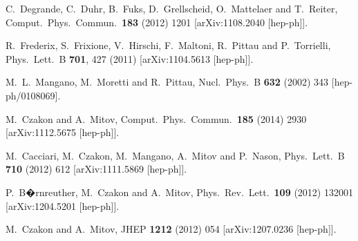\documentclass[preprintnumbers,superscriptaddress,nofootinbib,aps,prd,floatfix]{revtex4}
\begin{document}
\begin{thebibliography}{99}
  C.~Degrande, C.~Duhr, B.~Fuks, D.~Grellscheid, O.~Mattelaer and T.~Reiter,
  Comput.\ Phys.\ Commun.\  {\bf 183} (2012) 1201
  [arXiv:1108.2040 [hep-ph]].

  R.~Frederix, S.~Frixione, V.~Hirschi, F.~Maltoni, R.~Pittau and P.~Torrielli,
  Phys.\ Lett.\ B {\bf 701}, 427 (2011)
  [arXiv:1104.5613 [hep-ph]].

  M.~L.~Mangano, M.~Moretti and R.~Pittau,
  Nucl.\ Phys.\ B {\bf 632} (2002) 343
  [hep-ph/0108069].
  
  M.~Czakon and A.~Mitov,
  Comput.\ Phys.\ Commun.\  {\bf 185} (2014) 2930
  [arXiv:1112.5675 [hep-ph]].

  M.~Cacciari, M.~Czakon, M.~Mangano, A.~Mitov and P.~Nason,
  Phys.\ Lett.\ B {\bf 710} (2012) 612
  [arXiv:1111.5869 [hep-ph]].
  
  P.~B�rnreuther, M.~Czakon and A.~Mitov,
  Phys.\ Rev.\ Lett.\  {\bf 109} (2012) 132001
  [arXiv:1204.5201 [hep-ph]].

  M.~Czakon and A.~Mitov,
  JHEP {\bf 1212} (2012) 054
  [arXiv:1207.0236 [hep-ph]].
      

\end{thebibliography}
\end{document}
